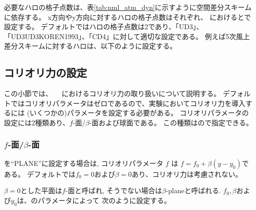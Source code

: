 必要なハロの格子点数は、表\ref{tab:nml_atm_dyn}に示すように空間差分スキームに依存する。
x方向やy方向に対するハロの格子点数はそれぞれ、
におけるとで設定する。
デフォルトではハロの格子点数は2であり、「UD3」、「UD3UD3KOREN1993」、「CD4」に対して適切な設定である。
例えば5次風上差分スキームに対するハロは、以下のように設定する。


\subsection{コリオリ力の設定} \label{subsec:coriolis}

この小節では、 \scalerm　におけるコリオリ力の取り扱いについて説明する。
デフォルトではコリオリパラメータはゼロであるので、実験においてコリオリ力を導入するには
(いくつかの)パラメータを設定する必要がある。
コリオリパラメータの設定には2種類あり、$f$-面/$\beta$-面および球面である。
この種類はので指定できる。

\subsubsection{$f$-面/$\beta$-面}
を``PLANE''に設定する場合は,
コリオリパラメータ $f$ は $f=f_0 + \beta (y-y_0)$である。
デフォルトでは$f_0=0$および$\beta=0$あり、コリオリ力は考慮されない。

$\beta=0$とした平面は$f$-面と呼ばれ, そうでない場合は$\beta$-planeと呼ばれる.
$f_0, \beta$および$y_0$は、のパラメータによって
次のように設定する。

